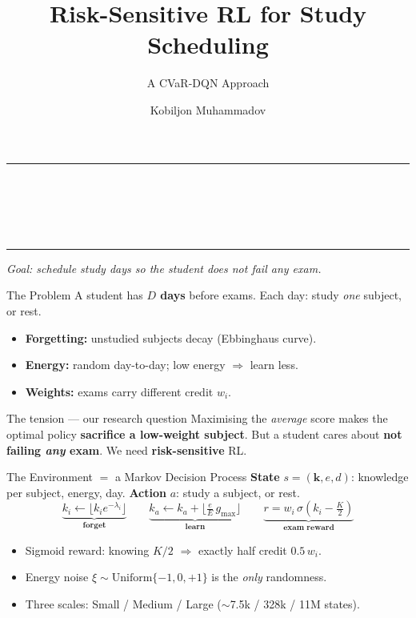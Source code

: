 \documentclass[aspectratio=169,11pt]{beamer}
\title{Risk-Sensitive RL for Study Scheduling}
\subtitle{A CVaR-DQN Approach}
\author{Kobiljon Muhammadov}
\institute{RL and Decision Making Under Uncertainty --- Spring 2026}
\date{}
\newcommand{\hl}[1]{{\color{accent}\textbf{#1}}}
\newcommand{\win}[1]{{\color{good}\textbf{#1}}}
\newcommand{\bad}[1]{{\color{accent2}\textbf{#1}}}
\begin{document}
{
\begin{frame}
  \vfill
  {\color{accent}\rule{\textwidth}{2pt}}\\[4pt]
  {\color{ink}\inserttitle}\\[2pt]
  {\large\color{accent}\insertsubtitle}\\[10pt]
  {\insertauthor \hfill \insertinstitute}\\[4pt]
  {\color{accent}\rule{\textwidth}{2pt}}
  \vfill
  \begin{center}\itshape\color{ink!70}
  Goal: schedule study days so the student does not fail \emph{any} exam.
  \end{center}
  \vfill
\end{frame}}

\begin{frame}{The Problem}
  A student has \hl{$D$ days} before exams. Each day: study \emph{one} subject, or rest.
  \begin{itemize}
    \item \hl{Forgetting:} unstudied subjects decay (Ebbinghaus curve).
    \item \hl{Energy:} random day-to-day; low energy $\Rightarrow$ learn less.
    \item \hl{Weights:} exams carry different credit $w_i$.
  \end{itemize}
  \vspace{0.8em}
  \begin{block}{The tension --- our research question}
    Maximising the \emph{average} score makes the optimal policy
    \bad{sacrifice a low-weight subject}. But a student cares about
    \win{not failing \emph{any} exam}. We need \hl{risk-sensitive} RL.
  \end{block}
\end{frame}

\begin{frame}{The Environment $=$ a Markov Decision Process}
  \hl{State} $s=(\mathbf{k},e,d)$: knowledge per subject, energy, day.\quad
  \hl{Action} $a$: study a subject, or rest.
  \vspace{0.6em}
  \[
  \underbrace{k_i \leftarrow \lfloor k_i e^{-\lambda_i}\rfloor}_{\textbf{forget}}\qquad
  \underbrace{k_a \leftarrow k_a + \lfloor \tfrac{e}{E}\,g_{\max}\rfloor}_{\textbf{learn}}\qquad
  \underbrace{r = w_i\,\sigma(k_i-\tfrac{K}{2})}_{\textbf{exam reward}}
  \]
  \vspace{0.4em}
  \begin{itemize}
    \item Sigmoid reward: knowing $K/2$ $\Rightarrow$ exactly half credit $0.5\,w_i$.
    \item Energy noise $\xi\!\sim\!\mathrm{Uniform}\{-1,0,+1\}$ is the \emph{only} randomness.
    \item Three scales: Small / Medium / Large ($\sim$7.5k / 328k / 11M states).
  \end{itemize}
\end{frame}
\end{document}
